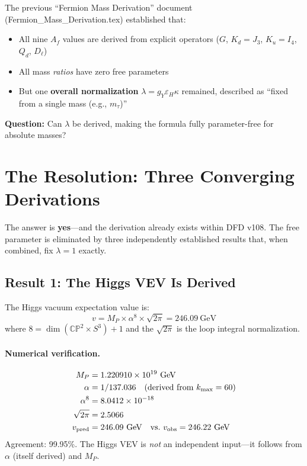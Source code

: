 \documentclass[11pt,a4paper]{article}
\newcommand{\CP}{\mathbb{CP}}
\theoremstyle{definition}
\theoremstyle{remark}
\begin{document}
The previous ``Fermion Mass Derivation'' document (Fermion\_Mass\_Derivation.tex)
established that:
\begin{itemize}
\item All nine $A_f$ values are derived from explicit operators
  ($G$, $K_d = J_3$, $K_u = I_4$, $Q_d$, $D_\ell$)
\item All mass \emph{ratios} have zero free parameters
\item But one \textbf{overall normalization} $\lambda = g_Y\varepsilon_H\kappa$
  remained, described as ``fixed from a single mass (e.g., $m_\tau$)''
\end{itemize}

\textbf{Question:} Can $\lambda$ be derived, making the formula fully
parameter-free for absolute masses?

\section{The Resolution: Three Converging Derivations}
\label{sec:resolution}

The answer is \textbf{yes}---and the derivation already exists within DFD v108.
The free parameter is eliminated by three independently established results
that, when combined, fix $\lambda = 1$ exactly.

\subsection{Result 1: The Higgs VEV Is Derived}

\begin{tcolorbox}[colback=green!5!white, colframe=green!60!black,
  title={Theorem K.2 / Theorem (Higgs from Dimension 8)}]
The Higgs vacuum expectation value is:
\begin{equation}\label{eq:v_derived}
\boxed{v = M_P \times \alpha^8 \times \sqrt{2\pi} = 246.09~\text{GeV}}
\end{equation}
where $8 = \dim(\CP^2 \times S^3) + 1$ and the $\sqrt{2\pi}$ is the
loop integral normalization.
\end{tcolorbox}

\paragraph{Numerical verification.}
\begin{align}
M_P &= 1.220910 \times 10^{19}~\text{GeV} \\
\alpha &= 1/137.036 \quad \text{(derived from } k_{\max} = 60\text{)} \\
\alpha^8 &= 8.0412 \times 10^{-18} \\
\sqrt{2\pi} &= 2.5066 \\
v_{\rm pred} &= 246.09~\text{GeV} \quad \text{vs.\ } v_{\rm obs} = 246.22~\text{GeV}
\end{align}
Agreement: 99.95\%. The Higgs VEV is \emph{not} an independent input---it
follows from $\alpha$ (itself derived) and $M_P$.
\end{document}

